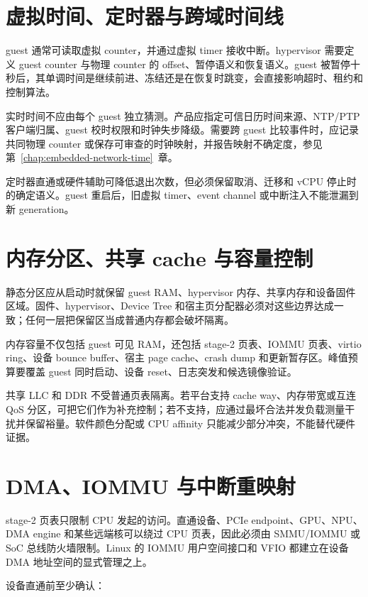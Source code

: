 \section{虚拟时间、定时器与跨域时间线}

guest 通常可读取虚拟 counter，并通过虚拟 timer 接收中断。hypervisor 需要定义 guest counter 与物理 counter 的 offset、暂停语义和恢复语义。guest 被暂停十秒后，其单调时间是继续前进、冻结还是在恢复时跳变，会直接影响超时、租约和控制算法。

实时时间不应由每个 guest 独立猜测。产品应指定可信日历时间来源、NTP/PTP 客户端归属、guest 校时权限和时钟失步降级。需要跨 guest 比较事件时，应记录共同物理 counter 或保存可审查的时钟映射，并报告映射不确定度，参见 \mbox{第~\ref{chap:embedded-network-time}~章}。

定时器直通或硬件辅助可降低退出次数，但必须保留取消、迁移和 vCPU 停止时的确定语义。guest 重启后，旧虚拟 timer、event channel 或中断注入不能泄漏到新 generation。

\section{内存分区、共享 cache 与容量控制}

静态分区应从启动时就保留 guest RAM、hypervisor 内存、共享内存和设备固件区域。固件、hypervisor、Device Tree 和宿主页分配器必须对这些边界达成一致；任何一层把保留区当成普通内存都会破坏隔离。

内存容量不仅包括 guest 可见 RAM，还包括 stage-2 页表、IOMMU 页表、virtio ring、设备 bounce buffer、宿主 page cache、crash dump 和更新暂存区。峰值预算要覆盖 guest 同时启动、设备 reset、日志突发和候选镜像验证。

共享 LLC 和 DDR 不受普通页表隔离。若平台支持 cache way、内存带宽或互连 QoS 分区，可把它们作为补充控制；若不支持，应通过最坏合法并发负载测量干扰并保留裕量。软件颜色分配或 CPU affinity 只能减少部分冲突，不能替代硬件证据。

\section{DMA、IOMMU 与中断重映射}

stage-2 页表只限制 CPU 发起的访问。直通设备、PCIe endpoint、GPU、NPU、DMA engine 和某些远端核可以绕过 CPU 页表，因此必须由 SMMU/IOMMU 或 SoC 总线防火墙限制。Linux 的 IOMMU 用户空间接口和 VFIO 都建立在设备 DMA 地址空间的显式管理之上\cite{linux-iommu-userspace,linux-vfio}。

设备直通前至少确认：

